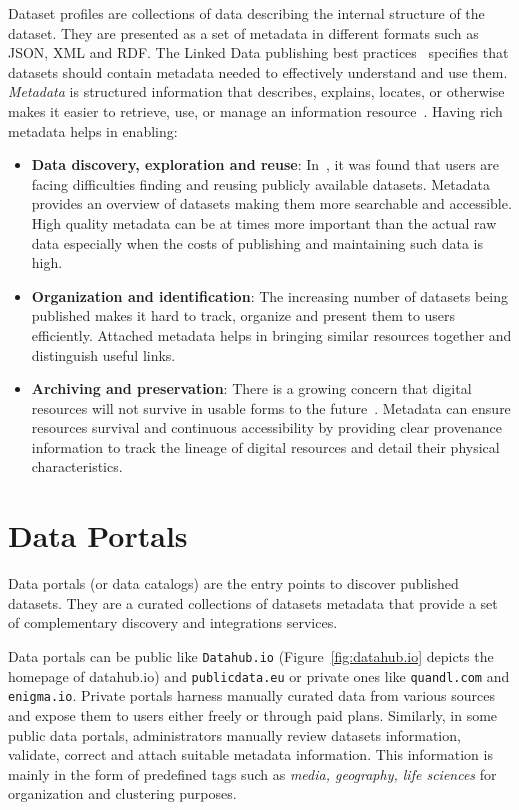 Dataset profiles are collections of data describing the internal structure of the dataset. They are presented as a set of metadata in different formats such as JSON, XML and RDF. The Linked Data publishing best practices~\cite{Bizer:DB:11} specifies that datasets should contain metadata needed to effectively understand and use them. \textit{Metadata} is structured information that describes, explains, locates, or otherwise makes it easier to retrieve, use, or manage an information resource~\cite{NISO:TechReport:04}. Having rich metadata helps in enabling:
\begin{itemize}
  \item \textbf{Data discovery, exploration and reuse}: In~\cite{Graham:TechReport:11}, it was found that users are facing difficulties finding and reusing publicly available datasets. Metadata provides an overview of datasets making them more searchable and accessible. High quality metadata can be at times more important than the actual raw data especially when the costs of publishing and maintaining such data is high.
  \item \textbf{Organization and identification}: The increasing number of datasets being published makes it hard to track, organize and present them to users efficiently. Attached metadata helps in bringing similar resources together and distinguish useful links.
  \item \textbf{Archiving and preservation}: There is a growing concern that digital resources will not survive in usable forms to the future~\cite{NISO:TechReport:04}. Metadata can ensure resources survival and continuous accessibility by providing clear provenance information to track the lineage of digital resources and detail their physical characteristics.
\end{itemize}

\section{Data Portals}\label{sec:dataPortals}

Data portals (or data catalogs) are the entry points to discover published datasets. They are a curated collections of datasets metadata that provide a set of complementary discovery and integrations services.

Data portals can be public like \texttt{Datahub.io} (Figure~\ref{fig:datahub.io} depicts the homepage of datahub.io) and \texttt{publicdata.eu} or private ones like \texttt{quandl.com} and \texttt{enigma.io}. Private portals harness manually curated data from various sources and expose them to users either freely or through paid plans. Similarly, in some public data portals, administrators manually review datasets information, validate, correct and attach suitable metadata information. This information is mainly in the form of predefined tags such as \textit{media, geography, life sciences} for organization and clustering purposes.

